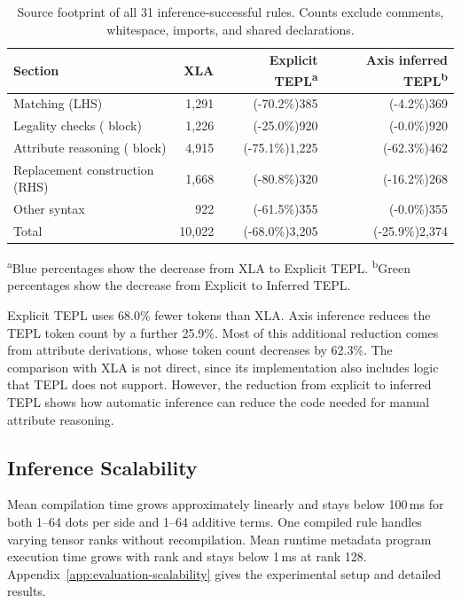 \begin{table}[!htbp]
\caption{Source footprint of all 31 inference-successful rules.
Counts exclude comments, whitespace, imports, and shared declarations.}
\label{tab:specification-size}
\small
{}
\setlength{\tabcolsep}{4pt}
\begin{tabularx}{\linewidth}{@{}Yrrr@{}}\toprule
Section & XLA & Explicit TEPL\textsuperscript{a} & Axis inferred TEPL\textsuperscript{b}\\\midrule
Matching (LHS) & 1,291 & \textcolor{specificationBlue}{(-70.2\%)}385 & \textcolor{specificationGreen}{(-4.2\%)}369\\
Legality checks ( block) & 1,226 & \textcolor{specificationBlue}{(-25.0\%)}920 & \textcolor{specificationGreen}{(-0.0\%)}920\\
Attribute reasoning ( block) & 4,915 & \textcolor{specificationBlue}{(-75.1\%)}1,225 & \textcolor{specificationGreen}{(-62.3\%)}462\\
Replacement construction (RHS) & 1,668 & \textcolor{specificationBlue}{(-80.8\%)}320 & \textcolor{specificationGreen}{(-16.2\%)}268\\
Other syntax & 922 & \textcolor{specificationBlue}{(-61.5\%)}355 & \textcolor{specificationGreen}{(-0.0\%)}355\\\midrule
Total & 10,022 & \textcolor{specificationBlue}{(-68.0\%)}3,205 & \textcolor{specificationGreen}{(-25.9\%)}2,374\\\bottomrule
\end{tabularx}
\par\smallskip
{\footnotesize\raggedright
\textsuperscript{a}\textcolor{specificationBlue}{Blue percentages} show the decrease from XLA to Explicit TEPL.
\textsuperscript{b}\textcolor{specificationGreen}{Green percentages} show the decrease from Explicit to Inferred TEPL.\par}
\end{table}

Explicit TEPL uses 68.0\% fewer tokens than XLA.
Axis inference reduces the TEPL token count by a further 25.9\%.
Most of this additional reduction comes from attribute derivations,
whose token count decreases by 62.3\%.
The comparison with XLA is not direct, since its implementation
also includes logic that TEPL does not support.
However, the reduction from explicit to inferred TEPL shows how
automatic inference can reduce the code needed for manual attribute
reasoning.

\subsection{Inference Scalability}
\label{sec:evaluation-cost}
Mean compilation time grows approximately linearly and stays below 100\,ms
for both 1--64 dots per side and 1--64 additive terms. One compiled rule
handles varying tensor ranks without recompilation. Mean runtime metadata
program execution time grows with rank and stays below 1\,ms at rank 128.
Appendix~\ref{app:evaluation-scalability} gives the experimental setup and
detailed results.
